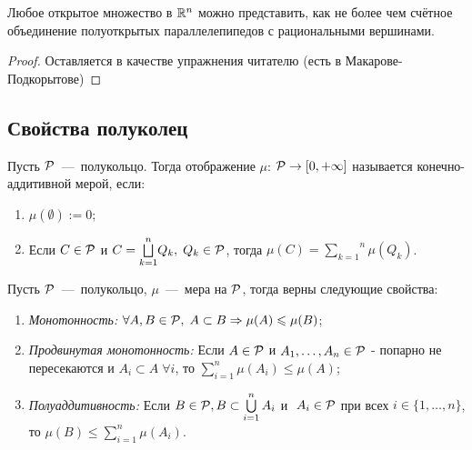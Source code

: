 \proposition Любое открытое множество в $\mathbb{R}^n$ можно представить, как не более чем счётное объединение полуоткрытых параллелепипедов с рациональными вершинами.

\begin{proof}
Оставляется в качестве упражнения читателю (есть в Макарове-Подкорытове)
\end{proof}

\subsection{Свойства полуколец}

 Пусть $\mathcal{P}$~---~полукольцо. Тогда отображение $\mu$: $\mathcal{P} \rightarrow [0, +\infty]$ называется конечно-аддитивной мерой, если:

\begin{enumerate}
    \item $\mu (\emptyset) := 0$;
    \item Если $C \in \mathcal{P}$ и $C = \overset{n}{\underset{k = 1}{\bigsqcup}} Q_k, \; Q_k \in \mathcal{P}$, тогда $\mu(C) = \overset{n}{\underset{k = 1}{\sum}} \mu(Q_k)$.
\end{enumerate}
\lemma Пусть $\mathcal{P}$~---~полукольцо, $\mu$~---~мера на $\mathcal{P}$, тогда верны следующие свойства:

\begin{enumerate}
    \item \textit{Монотонность:} $\forall A, B \in \mathcal{P}, \; A \subset B \Rightarrow \mu(A) \leqslant \mu(B)$;
    \item \textit{Продвинутая монотонность:} Если $A \in \mathcal{P}$ и $A_1, \dots, A_n \in \mathcal{P}$ - попарно не пересекаются и $A_i \subset A \; \forall i$, то $\sum\limits_{i = 1}^{n}\mu(A_i) \leq \mu(A)$;
    \item \textit{Полуаддитивность:} Если $B \in \mathcal{P}, B \subset \bigcup\limits_{i = 1}^{n} A_i$ и $\ A_i \in \mathcal{P}$ при всех $i \in \{1, \ldots, n\}$, то $\mu(B) \leq \sum\limits_{i = 1}^{n} \mu(A_i)$.
\end{enumerate}

